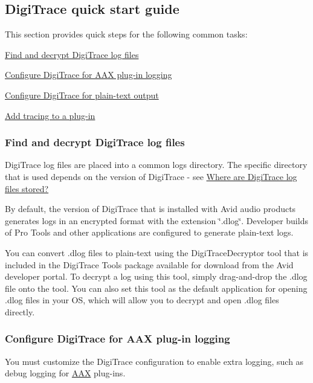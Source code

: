  \hypertarget{a00364_digitrace__quickstart}{}\subsection{Digi\+Trace quick start guide}\label{a00364_digitrace__quickstart}
 This section provides quick steps for the following common tasks\+: \begin{DoxyItemize}
\item \hyperlink{a00364_digitrace__gettingstarted__logfiles}{Find and decrypt Digi\+Trace log files} \item \hyperlink{a00364_digitrace__gettingstarted__config}{Configure Digi\+Trace for A\+A\+X plug-\/in logging} \item \hyperlink{a00364_digitrace__gettingstarted__configurefordevelopment}{Configure Digi\+Trace for plain-\/text output} \item \hyperlink{a00364_digitrace__gettingstarted__addingtracing}{Add tracing to a plug-\/in}\end{DoxyItemize}
\hypertarget{a00364_digitrace__gettingstarted__logfiles}{}\subsubsection{Find and decrypt Digi\+Trace log files}\label{a00364_digitrace__gettingstarted__logfiles}
 Digi\+Trace log files are placed into a common logs directory. The specific directory that is used depends on the version of Digi\+Trace -\/ see \hyperlink{a00364_digitrace__logfiles__wherearethelogs}{Where are Digi\+Trace log files stored?}

 By default, the version of Digi\+Trace that is installed with Avid audio products generates logs in an encrypted format with the extension \char`\"{}.\+dlog\char`\"{}. Developer builds of Pro Tools and other applications are configured to generate plain-\/text logs.

 You can convert .dlog files to plain-\/text using the Digi\+Trace\+Decryptor tool that is included in the Digi\+Trace Tools package available for download from the Avid developer portal. To decrypt a log using this tool, simply drag-\/and-\/drop the .dlog file onto the tool. You can also set this tool as the default application for opening .dlog files in your O\+S, which will allow you to decrypt and open .dlog files directly.

\hypertarget{a00364_digitrace__gettingstarted__config}{}\subsubsection{Configure Digi\+Trace for A\+A\+X plug-\/in logging}\label{a00364_digitrace__gettingstarted__config}
 You must customize the Digi\+Trace configuration to enable extra logging, such as debug logging for \hyperlink{a00288}{A\+A\+X} plug-\/ins.

